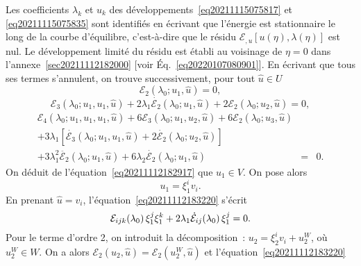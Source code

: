 \documentclass[12pt, final]{amsart}
\begin{document}
Les coefficients $\lambda_k$ et $u_k$ des
d{\'e}veloppements~\eqref{eq20211115075817} et \eqref{eq20211115075835} sont
identifi{\'e}s en {\'e}crivant que l'{\'e}nergie est stationnaire le long de
la courbe d'{\'e}quilibre, c'est-{\`a}-dire que le r{\'e}sidu $\mathcal{E}_{,
u}  [u (\eta), \lambda (\eta)]$ est nul. Le d{\'e}veloppement limit{\'e} du
r{\'e}sidu est {\'e}tabli au voisinage de $\eta = 0$ dans
l'annexe~\ref{sec20211112182000} [voir {\'E}q.~\eqref{eq20220107080901}]. En
{\'e}crivant que tous ses termes s'annulent, on trouve successivement, pour
tout $\hat{u} \in U$
\begin{equation}
  \label{eq20211112182917} \mathcal{E}_2 (\lambda_0 ; u_1, \hat{u}) = 0,
\end{equation}
\begin{equation}
  \label{eq20211112183220} \mathcal{E}_3 (\lambda_0 ; u_1, u_1, \hat{u}) + 2
  \lambda_1  \dot{\mathcal{E}_2} (\lambda_0 ; u_1, \hat{u}) + 2\mathcal{E}_2
  (\lambda_0 ; u_2, \hat{u}) = 0,
\end{equation}
\begin{eqnarray}
  \mathcal{E}_4 (\lambda_0 ; u_1, u_1, u_1, \hat{u}) + 6\mathcal{E}_3
  (\lambda_0 ; u_1, u_2, \hat{u}) + 6\mathcal{E}_2 (\lambda_0 ; u_3, \hat{u})
  &  &  \nonumber\\
  + 3 \lambda_1  [\dot{\mathcal{E}_3} (\lambda_0 ; u_1, u_1, \hat{u}) + 2
  \dot{\mathcal{E}_2} (\lambda_0 ; u_2, \hat{u})] &  &  \nonumber\\
  + 3 \lambda_1^2  \ddot{\mathcal{E}_2} (\lambda_0 ; u_1, \hat{u}) + 6
  \lambda_2  \dot{\mathcal{E}_2} (\lambda_0 ; u_1, \hat{u}) & = & 0.
  \label{eq20220114135717}
\end{eqnarray}
On d{\'e}duit de l'{\'e}quation~\eqref{eq20211112182917} que $u_1 \in V$. On
pose alors
\begin{equation}
  \label{eq20220124135236} u_1 = \xi_1^i v_i .
\end{equation}
En prenant $\hat{u} = v_i$, l'{\'e}quation~\eqref{eq20211112183220}
s'{\'e}crit
\begin{equation}
  \label{eq20220216140121} \mathcal{E}_{i  j  k} (\lambda_0)
  \hspace{0.17em} \xi_1^j \xi_1^k + 2 \lambda_1  \dot{\mathcal{E}}_{i
  j} (\lambda_0)  \hspace{0.17em} \xi_1^j = 0.
\end{equation}
Pour le terme d'ordre 2, on introduit la d{\'e}composition~: $u_2 = \xi_2^i
v_i + u_2^W$, o{\`u} $u_2^W \in W$. On a alors $\mathcal{E}_2 (u_2, \hat{u})
=\mathcal{E}_2 (u_2^W, \hat{u})$ et l'{\'e}quation~\eqref{eq20211112183220}
\end{document}
